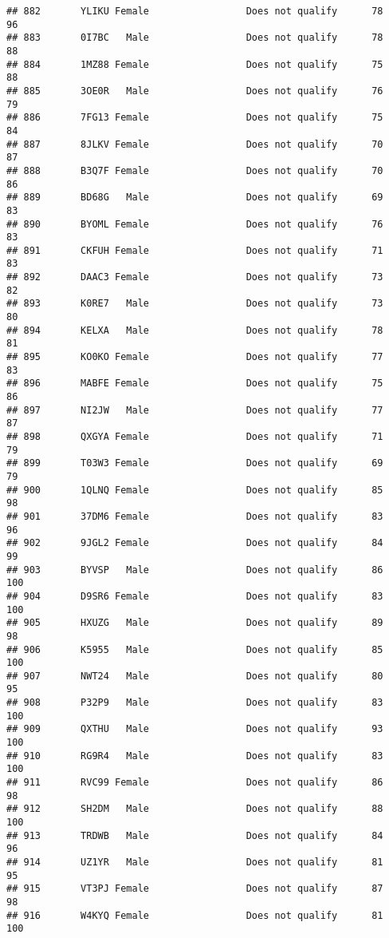 \documentclass[
]{article}
\begin{document}
\begin{verbatim}
## 882       YLIKU Female                 Does not qualify      78       96
## 883       0I7BC   Male                 Does not qualify      78       88
## 884       1MZ88 Female                 Does not qualify      75       88
## 885       3OE0R   Male                 Does not qualify      76       79
## 886       7FG13 Female                 Does not qualify      75       84
## 887       8JLKV Female                 Does not qualify      70       87
## 888       B3Q7F Female                 Does not qualify      70       86
## 889       BD68G   Male                 Does not qualify      69       83
## 890       BYOML Female                 Does not qualify      76       83
## 891       CKFUH Female                 Does not qualify      71       83
## 892       DAAC3 Female                 Does not qualify      73       82
## 893       K0RE7   Male                 Does not qualify      73       80
## 894       KELXA   Male                 Does not qualify      78       81
## 895       KO0KO Female                 Does not qualify      77       83
## 896       MABFE Female                 Does not qualify      75       86
## 897       NI2JW   Male                 Does not qualify      77       87
## 898       QXGYA Female                 Does not qualify      71       79
## 899       T03W3 Female                 Does not qualify      69       79
## 900       1QLNQ Female                 Does not qualify      85       98
## 901       37DM6 Female                 Does not qualify      83       96
## 902       9JGL2 Female                 Does not qualify      84       99
## 903       BYVSP   Male                 Does not qualify      86      100
## 904       D9SR6 Female                 Does not qualify      83      100
## 905       HXUZG   Male                 Does not qualify      89       98
## 906       K5955   Male                 Does not qualify      85      100
## 907       NWT24   Male                 Does not qualify      80       95
## 908       P32P9   Male                 Does not qualify      83      100
## 909       QXTHU   Male                 Does not qualify      93      100
## 910       RG9R4   Male                 Does not qualify      83      100
## 911       RVC99 Female                 Does not qualify      86       98
## 912       SH2DM   Male                 Does not qualify      88      100
## 913       TRDWB   Male                 Does not qualify      84       96
## 914       UZ1YR   Male                 Does not qualify      81       95
## 915       VT3PJ Female                 Does not qualify      87       98
## 916       W4KYQ Female                 Does not qualify      81      100

\end{verbatim}
\end{document}
